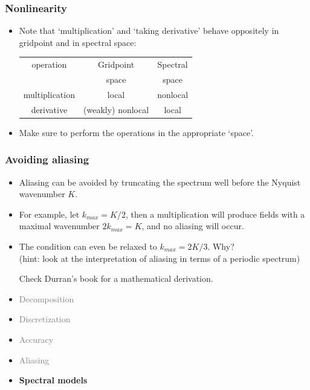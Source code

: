 \documentclass[aspectratio=149,9pt]{beamer}
\begin{document}
%
%
\begin{frame}
	\frametitle{Nonlinearity}
	\vfill\begin{itemize}
		\item Note that `multiplication' and `taking derivative' behave oppositely in gridpoint and in spectral space:\vfill
			\begin{center}
				\def\arraystretch{1.5}
				\begin{tabular}{c|cc}
					operation	&	Gridpoint	&	Spectral	\\[-1.8ex]
										& space & space	\\
				\hline\hline
					multiplication	&	local	&	nonlocal	\\
					derivative	&	(weakly) nonlocal	&	local	\\
				\end{tabular}
				\def\arraystretch{1}
			\end{center}\vfill
		\item Make sure to perform the operations in the appropriate `space'.
	\end{itemize}\vfill
\end{frame}
%
%
\begin{frame}
	\frametitle{Avoiding aliasing}
	\vfill\begin{itemize}
		\item Aliasing can be avoided by truncating the spectrum well before the Nyquist wavenumber $K$.\vfill
		\item For example, let $k_{max}=K/2$, then a multiplication will produce fields with a maximal wavenumber $2k_{max}=K$, and no aliasing will occur.\vfill
		\item The condition can even be relaxed to $k_{max}=2K/3$. Why?\\
			(hint: look at the interpretation of aliasing in terms of a periodic spectrum)
			\vfill\par
			Check Durran's book for a mathematical derivation.
	\end{itemize}\vfill
\end{frame}
%
%
\begin{frame}
	\begin{itemize}
		\item \textcolor{gray}{Decomposition}
		\item \textcolor{gray}{Discretization}
		\item \textcolor{gray}{Accuracy}
		\item \textcolor{gray}{Aliasing}
		\item {\bfseries Spectral models}
	\end{itemize}
\end{frame}
\end{document}

